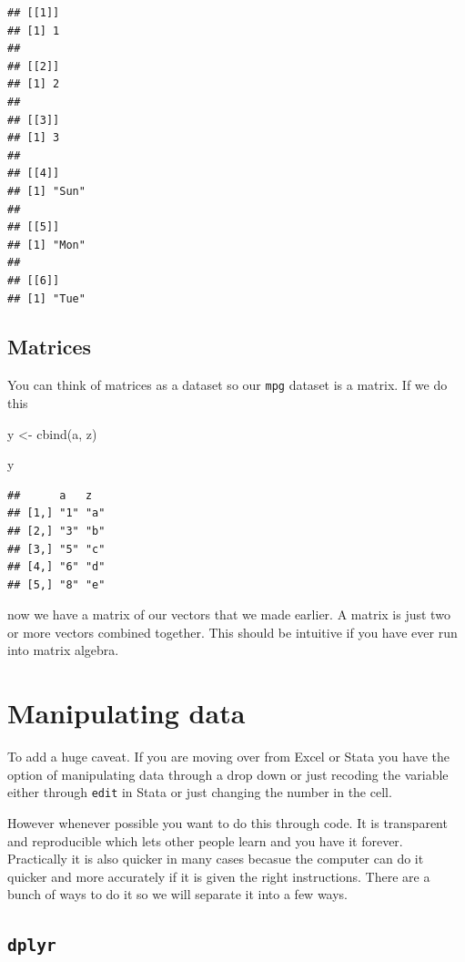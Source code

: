 \documentclass[]{tufte-handout}
\newenvironment{Shaded}{}{}
\newcommand{\FunctionTok}[1]{\textcolor[rgb]{0.02,0.16,0.49}{#1}}
\newcommand{\NormalTok}[1]{#1}
\newcommand{\OtherTok}[1]{\textcolor[rgb]{0.00,0.44,0.13}{#1}}
\begin{document}
\begin{verbatim}
## [[1]]
## [1] 1
## 
## [[2]]
## [1] 2
## 
## [[3]]
## [1] 3
## 
## [[4]]
## [1] "Sun"
## 
## [[5]]
## [1] "Mon"
## 
## [[6]]
## [1] "Tue"
\end{verbatim}

\hypertarget{matrices}{%
\subsection{Matrices}\label{matrices}}

You can think of matrices as a dataset so our \texttt{mpg} dataset is a
matrix. If we do this

\begin{Shaded}
\begin{Highlighting}[]
\NormalTok{y }\OtherTok{\textless{}{-}} \FunctionTok{cbind}\NormalTok{(a, z)}

\NormalTok{y}
\end{Highlighting}
\end{Shaded}

\begin{verbatim}
##      a   z  
## [1,] "1" "a"
## [2,] "3" "b"
## [3,] "5" "c"
## [4,] "6" "d"
## [5,] "8" "e"
\end{verbatim}

now we have a matrix of our vectors that we made earlier. A matrix is
just two or more vectors combined together. This should be intuitive if
you have ever run into matrix algebra.

\hypertarget{manipulating-data}{%
\section{Manipulating data}\label{manipulating-data}}

To add a huge caveat. If you are moving over from Excel or Stata you
have the option of manipulating data through a drop down or just
recoding the variable either through \texttt{edit} in Stata or just
changing the number in the cell.

However whenever possible you want to do this through code. It is
transparent and reproducible which lets other people learn and you have
it forever. Practically it is also quicker in many cases becasue the
computer can do it quicker and more accurately if it is given the right
instructions. There are a bunch of ways to do it so we will separate it
into a few ways.

\hypertarget{dplyr}{%
\subsection{\texorpdfstring{\texttt{dplyr}}{dplyr}}\label{dplyr}}
\end{document}
